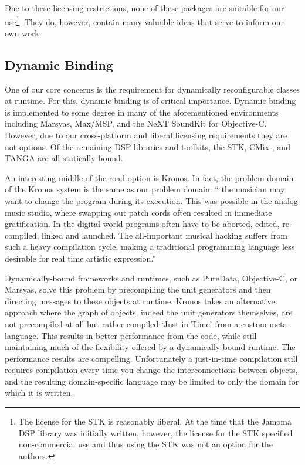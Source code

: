 \documentclass[twoside,10pt]{article}
\begin{document}
Due to these licensing restrictions, none of these packages are suitable for our use\footnote{The license for the STK is reasonably liberal.  At the time that the Jamoma DSP library was initially written, however, the license for the STK specified non-commercial use and thus using the STK was not an option for the authors.}.  They do, however, contain many valuable ideas that serve to inform our own work.



\subsection{Dynamic Binding} %

One of our core concerns is the requirement for dynamically reconfigurable classes at runtime.  For this, dynamic binding is of critical importance.  Dynamic binding is implemented to some degree in many of the aforementioned environments including Marsyas, Max/MSP, and the NeXT SoundKit for Objective-C.  However, due to our cross-platform and liberal licensing requirements they are not options.  Of the remaining DSP libraries and toolkits, the STK\cite{Cook:1999}, CMix \cite{Lansky:1990}, and TANGA \cite{Reiter:2007} are all statically-bound.  

An interesting middle-of-the-road option is Kronos.  In fact, the problem domain of the Kronos system is the same as our problem domain: `` the musician may want to change the program during its execution. This was possible in the analog music studio, where swapping out patch cords often resulted in immediate gratification. In the digital world programs often have to be aborted, edited, re- compiled, linked and launched. The all-important musical hacking suffers from such a heavy compilation cycle, making a traditional programming language less desirable for real time artistic expression.'' \cite{Norilo:2009}

Dynamically-bound frameworks and runtimes, such as PureData, Objective-C, or Marsyas, solve this problem by precompiling the unit generators and then directing messages to these objects at runtime.  Kronos takes an alternative approach where the graph of objects, indeed the unit generators themselves, are not precompiled at all but rather compiled `Just in Time' from a custom meta-language. This results in better performance from the code, while still maintaining much of the flexibility offered by a dynamically-bound runtime.  The performance results are compelling.  Unfortunately a just-in-time compilation still requires compilation every time you change the interconnections between objects, and the resulting domain-specific language may be limited to only the domain for which it is written.
\end{document}
